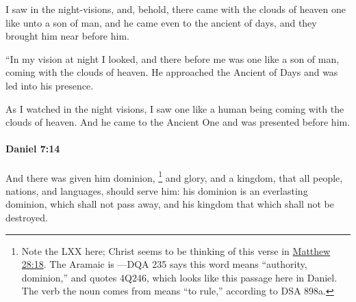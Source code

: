 			\begin{versebox}
					\item[BHS] 
					\item[LXX] 
					\item[ASV] I saw in the night-visions, and, behold, there came with the clouds of heaven one like unto a son of man, and he came even to the ancient of days, and they brought him near before him.
					\item[NIV] “In my vision at night I looked, and there before me was one like a son of man, coming with the clouds of heaven. He approached the Ancient of Days and was led into his presence.
					\item[NRSV] As I watched in the night visions, I saw one like a human being coming with the clouds of heaven. And he came to the Ancient One and was presented before him.
			\end{versebox}

		\paragraph{Daniel 7:14} %
			\label{DANIEL-7-14}

			And there was given him dominion,%
				\footnote{%
					Note the LXX  here; Christ seems to be thinking of this verse in \hyperref[MATTHEW-28-18]{Matthew 28:18}. The Aramaic is ---DQA 235 says this word means ``authority, dominion,'' and quotes 4Q246, which looks like this passage here in Daniel. The verb the noun comes from means ``to rule,'' according to DSA 898a.
					}
			and glory, and a kingdom, that all people, nations, and languages, should serve him: his dominion is an everlasting dominion, which shall not pass away, and his kingdom that which shall not be destroyed.

